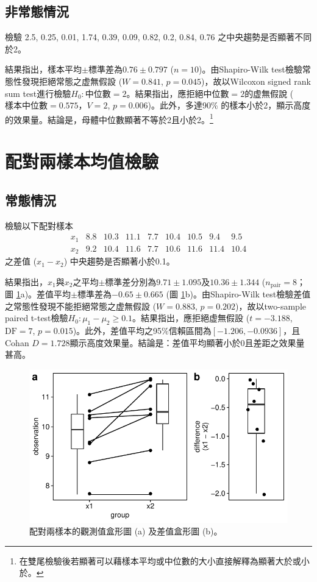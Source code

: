 \documentclass[12pt, a4paper, onecolumn]{article}
\begin{document}
\subsection{非常態情況}
檢驗 2.5, 0.25, 0.01, 1.74, 0.39, 0.09, 0.82, 0.2, 0.84, 0.76 之中央趨勢是否顯著不同於2。

結果指出，樣本平均$\pm$標準差為$0.76 \pm 0.797$ ($n = 10$)。由Shapiro-Wilk test檢驗常態性發現拒絕常態之虚無假設 ($W = 0.841$, $p = 0.045$)，故以Wilcoxon signed rank sum test進行檢驗$H_0: \text{中位數}=2$。結果指出，應拒絕中位數$=2$的虚無假說 ($\text{樣本中位數}=0.575$，$V = 2$, $p = 0.006$)。此外，多達90\% 的樣本小於2，顯示高度的效果量。結論是，母體中位數顯著不等於2且小於2。\footnote{在雙尾檢驗後若顯著可以藉樣本平均或中位數的大小直接解釋為顯著大於或小於。}

\section{配對兩樣本均值檢驗}
\subsection{常態情況}
檢驗以下配對樣本
\[
\begin{matrix}
x_1 & 8.8 & 10.3 & 11.1 & 7.7 &10.4 & 10.5 & 9.4 & 9.5 \\
x_2 & 9.2 & 10.4 & 11.6 & 7.7 & 10.6 & 11.6 & 11.4 & 10.4
\end{matrix}
\]
之差值 ($x_1 - x_2$) 中央趨勢是否顯著小於0.1。

結果指出，$x_1$與$x_2$之平均$\pm$標準差分別為$9.71 \pm 1.095$及$10.36 \pm 1.344$ ($n_\mathrm{pair} = 8$； 圖 \ref{fig:normal_paired_test}a)。差值平均$\pm$標準差為$-0.65\pm0.665$  (圖 \ref{fig:normal_paired_test}b)。由Shapiro-Wilk test檢驗差值之常態性發現不能拒絕常態之虚無假設 ($W = 0.883$, $p = 0.202$)，故以two-sample paired t-test檢驗$H_0: \mu_1 - \mu_2 \geq 0.1$。結果指出，應拒絕虚無假設 ($t = -3.188$, $\text{DF} = 7$, $p = 0.015$)。此外，差值平均之95\%信賴區間為$\left[-1.206, -0.0936\right]$，且Cohan $D = 1.728$顯示高度效果量。結論是：差值平均顯著小於0且差距之效果量甚高。

\begin{figure}[ht!]
	\centering
	\includegraphics[]{normal_paired_test.pdf}
	\caption{配對兩樣本的觀測值盒形圖 (a) 及差值盒形圖 (b)。}
	\label{fig:normal_paired_test}
\end{figure}
\end{document}
